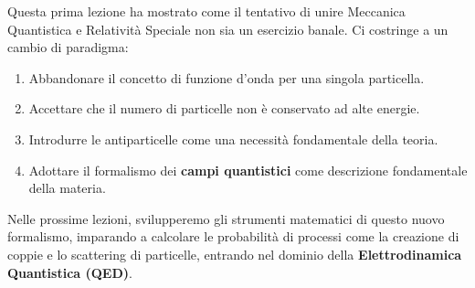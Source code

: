 Questa prima lezione ha mostrato come il tentativo di unire Meccanica Quantistica e Relatività Speciale non sia un esercizio banale. Ci costringe a un cambio di paradigma:
\begin{enumerate}
    \item Abbandonare il concetto di funzione d'onda per una singola particella.
    \item Accettare che il numero di particelle non è conservato ad alte energie.
    \item Introdurre le antiparticelle come una necessità fondamentale della teoria.
    \item Adottare il formalismo dei \textbf{campi quantistici} come descrizione fondamentale della materia.
\end{enumerate}
Nelle prossime lezioni, svilupperemo gli strumenti matematici di questo nuovo formalismo, imparando a calcolare le probabilità di processi come la creazione di coppie e lo scattering di particelle, entrando nel dominio della \textbf{Elettrodinamica Quantistica (QED)}.

